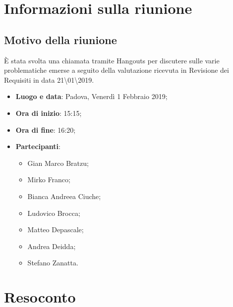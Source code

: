 \documentclass[a4paper,12pt]{article}
\begin{document}
	\tableofcontents
	\cleardoublepage
	\section{Informazioni sulla riunione}
	\subsection{Motivo della riunione} \`{E} stata svolta una chiamata tramite Hangouts per discutere sulle varie problematiche emerse a seguito della valutazione ricevuta in Revisione dei Requisiti in data 21\textbackslash01\textbackslash2019.
	\begin{itemize}
		\item \textbf{Luogo e data}: Padova, Venerdì 1 Febbraio 2019;
		\item \textbf{Ora di inizio}: 15:15;
		\item \textbf{Ora di fine}: 16:20;
		\item \textbf{Partecipanti}:  
		\begin{itemize}
			\item Gian Marco Bratzu;
			\item Mirko Franco;
			\item Bianca Andreea Ciuche;
			\item Ludovico Brocca;
			\item Matteo Depascale;
			\item Andrea Deidda;
			\item Stefano Zanatta.
		\end{itemize}
	\end{itemize}
	
	
	\section{Resoconto}
\end{document}
